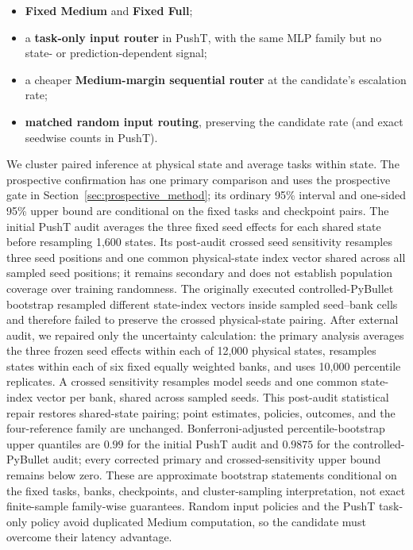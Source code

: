 \documentclass[10pt]{article}
\theoremstyle{definition}
\theoremstyle{remark}
\newcommand{\pusht}{PushT}
\begin{document}
\begin{itemize}
  \item \textbf{Fixed Medium} and \textbf{Fixed Full};
  \item a \textbf{task-only input router} in \pusht{}, with the same MLP family
  but no state- or prediction-dependent signal;
  \item a cheaper \textbf{Medium-margin sequential router} at the candidate's
  escalation rate;
  \item \textbf{matched random input routing}, preserving the candidate rate
  (and exact seedwise counts in \pusht{}).
\end{itemize}

We cluster paired inference at physical state and average tasks within state.
The prospective confirmation has one primary comparison and uses the prospective gate in
Section~\ref{sec:prospective_method}; its ordinary 95\% interval and one-sided 95\%
upper bound are conditional on the fixed tasks and checkpoint pairs.  The initial PushT audit
averages the three fixed seed effects for each shared state before
resampling 1,600 states.  Its post-audit crossed seed sensitivity resamples
three seed positions and one common physical-state index vector shared across
all sampled seed positions; it remains secondary and does not establish
population coverage over training randomness.
The originally executed controlled-PyBullet bootstrap resampled different state-index
vectors inside sampled seed--bank cells and therefore failed to preserve the
crossed physical-state pairing.  After external audit, we repaired only the
uncertainty calculation: the primary analysis averages the three frozen seed
effects within each of 12,000 physical states, resamples states within each of
six fixed equally weighted banks, and uses 10,000 percentile replicates.  A
crossed sensitivity resamples model seeds and one common state-index vector per
bank, shared across sampled seeds.  This post-audit statistical repair restores
shared-state pairing; point estimates, policies, outcomes, and the
four-reference family are unchanged.  Bonferroni-adjusted percentile-bootstrap upper quantiles are $0.99$ for the initial PushT audit
and $0.9875$ for the controlled-PyBullet audit; every corrected primary and crossed-sensitivity upper
bound remains below zero.  These are approximate bootstrap statements
conditional on the fixed tasks, banks, checkpoints, and cluster-sampling
interpretation, not exact finite-sample family-wise guarantees.  Random input policies and
the PushT task-only policy avoid duplicated Medium computation, so the
candidate must overcome their latency advantage.
\end{document}
